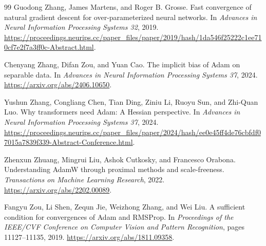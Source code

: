\documentclass[11pt,twoside]{article}
\theoremstyle{definition}
\theoremstyle{remark}
\begin{document}
\begin{thebibliography}{99}
Guodong Zhang, James Martens, and Roger B. Grosse.
\newblock Fast convergence of natural gradient descent for over-parameterized
neural networks.
\newblock In \emph{Advances in Neural Information Processing Systems 32},
2019.
\newblock \url{https://proceedings.neurips.cc/paper_files/paper/2019/hash/1da546f25222c1ee710cf7e2f7a3ff0c-Abstract.html}.

Chenyang Zhang, Difan Zou, and Yuan Cao.
\newblock The implicit bias of Adam on separable data.
\newblock In \emph{Advances in Neural Information Processing Systems 37},
2024.
\newblock \url{https://arxiv.org/abs/2406.10650}.

Yushun Zhang, Congliang Chen, Tian Ding, Ziniu Li, Ruoyu Sun, and Zhi-Quan Luo.
\newblock Why transformers need Adam: A Hessian perspective.
\newblock In \emph{Advances in Neural Information Processing Systems 37},
2024.
\newblock \url{https://proceedings.neurips.cc/paper_files/paper/2024/hash/ee0e45ff4de76cbfdf07015a7839f339-Abstract-Conference.html}.

Zhenxun Zhuang, Mingrui Liu, Ashok Cutkosky, and Francesco Orabona.
\newblock Understanding AdamW through proximal methods and scale-freeness.
\newblock \emph{Transactions on Machine Learning Research}, 2022.
\newblock \url{https://arxiv.org/abs/2202.00089}.

Fangyu Zou, Li Shen, Zequn Jie, Weizhong Zhang, and Wei Liu.
\newblock A sufficient condition for convergences of Adam and RMSProp.
\newblock In \emph{Proceedings of the IEEE/CVF Conference on Computer Vision
and Pattern Recognition}, pages 11127--11135, 2019.
\newblock \url{https://arxiv.org/abs/1811.09358}.

\end{thebibliography}
\end{document}
